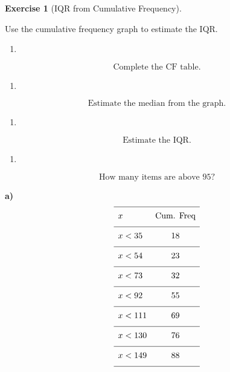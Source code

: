 \documentclass[
  letterpaper,
  DIV=11,
  numbers=noendperiod]{scrreprt}
\providecommand{\tightlist}{%
  \setlength{\itemsep}{0pt}\setlength{\parskip}{0pt}}
\theoremstyle{definition}
\newtheorem{exercise}{Exercise}[chapter]
\theoremstyle{remark}
\begin{document}
\begin{exercise}[IQR from Cumulative
Frequency]\protect\hypertarget{exr-cf-3}{}\label{exr-cf-3}

Use the cumulative frequency graph to estimate the IQR.

\begin{enumerate}
\def\labelenumi{\alph{enumi})}
\tightlist
\item
\end{enumerate}

\[\text{{Complete the CF table.}}\]

\begin{enumerate}
\def\labelenumi{\alph{enumi})}
\setcounter{enumi}{1}
\tightlist
\item
\end{enumerate}

\[\text{{Estimate the median from the graph.}}\]

\begin{enumerate}
\def\labelenumi{\alph{enumi})}
\setcounter{enumi}{2}
\tightlist
\item
\end{enumerate}

\[\text{{Estimate the IQR.}}\]

\begin{enumerate}
\def\labelenumi{\alph{enumi})}
\setcounter{enumi}{3}
\tightlist
\item
\end{enumerate}

\[\text{How many items are above }95?\]

\begin{tcolorbox}[enhanced jigsaw, opacitybacktitle=0.6, coltitle=black, arc=.35mm, colframe=quarto-callout-tip-color-frame, colback=white, bottomrule=.15mm, left=2mm, colbacktitle=quarto-callout-tip-color!10!white, titlerule=0mm, opacityback=0, title=\textcolor{quarto-callout-tip-color}{\faLightbulb}\hspace{0.5em}{🔍 View Solution}, leftrule=.75mm, breakable, rightrule=.15mm, bottomtitle=1mm, toptitle=1mm, toprule=.15mm]

\textbf{a)} \[{\renewcommand{\arraystretch}{1.6}\begin{array}{lc}
\hline x & \text{Cum. Freq} \\[4pt]
\hline x < 35 & 18 \\[4pt]
\hline x < 54 & 23 \\[4pt]
\hline x < 73 & 32 \\[4pt]
\hline x < 92 & 55 \\[4pt]
\hline x < 111 & 69 \\[4pt]
\hline x < 130 & 76 \\[4pt]
\hline x < 149 & 88 \\[4pt]
\hline
\end{array}}\]


\end{tcolorbox}
\end{exercise}
\end{document}
